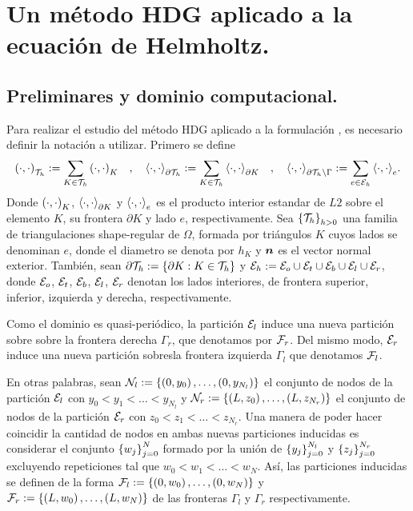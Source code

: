 \chapter{Un método HDG aplicado a la ecuación de Helmholtz.}
\section{Preliminares y dominio computacional.}
Para realizar el estudio del método HDG aplicado a la formulación , es necesario definir la notación a utilizar.
Primero se define
\[ \left( \cdot,\cdot \right)_{\mathcal{T}_h} := \sum_{K \in \mathcal{T}_h}{\left( \cdot,\cdot \right)_{K}} \quad,\quad \left\langle \cdot,\cdot \right\rangle_{\partial \mathcal{T}_h} := \sum_{K \in \mathcal{T}_h}{\left\langle \cdot,\cdot \right\rangle_{\partial K}} \quad,\quad  \left\langle \cdot,\cdot \right\rangle_{\partial \mathcal{T}_h \backslash \Gamma} := \sum_{e \in \mathcal{E}_h}{\left\langle \cdot,\cdot \right\rangle_{e}} .\]
Donde $\left( \cdot,\cdot \right)_K$, $\left\langle \cdot,\cdot \right\rangle_{\partial K}$ y $\left\langle \cdot,\cdot \right\rangle_{e}$ es el producto interior estandar de $L2$ sobre el elemento $K$, su frontera $\partial K$ y lado $e$, respectivamente. Sea $\left\{ \mathcal{T}_h \right\}_{h>0}$ una familia de triangulaciones {\sc shape-regular} de $\Omega$, formada por triángulos $K$ cuyos lados se denominan $e$, donde el diametro se denota por $h_K$ y $\boldsymbol n$ es el vector normal exterior. También, sean $\partial \mathcal{T}_h := \left\{ \partial K : K \in \mathcal{T}_h \right\}$ y $\mathcal{E}_h := \mathcal{E}_o \cup \mathcal{E}_t \cup \mathcal{E}_b \cup \mathcal{E}_l \cup \mathcal{E}_r$, donde $\mathcal{E}_o$, $\mathcal{E}_t$, $\mathcal{E}_b$, $\mathcal{E}_l$, $\mathcal{E}_r$ denotan los lados interiores, de frontera superior, inferior, izquierda y derecha, respectivamente.

Como el dominio es quasi-periódico, la partición $\mathcal{E}_l$ induce una nueva partición sobre sobre la frontera derecha $\Gamma_r$, que denotamos por $\mathcal{F}_r$. Del mismo modo, $\mathcal{E}_r$ induce una nueva partición sobresla frontera izquierda $\Gamma_l$ que denotamos $\mathcal{F}_l$. 

En otras palabras, sean $\mathcal{N}_l := \left\{ \left( 0,y_0 \right), \ldots , \left( 0,y_{N_l} \right) \right\}$ el conjunto de nodos de la partición $\mathcal{E}_l$ con $y_0 < y_1 < \ldots < y_{N_l}$ y $\mathcal{N}_r := \left\{ \left( L,z_0 \right), \ldots , \left( L,z_{N_r} \right) \right\}$ el conjunto de nodos de la partición $\mathcal{E}_r$ con $z_0 < z_1 < \ldots < z_{N_r}$. Una manera de poder hacer coincidir la cantidad de nodos en ambas nuevas particiones inducidas es considerar el conjunto $\left\{ w_j \right\}_{j=0}^N$ formado por la unión de $\left\{ y_j \right\}_{j=0}^{N_l}$ y $\left\{ z_j \right\}_{j=0}^{N_r}$ excluyendo repeticiones tal que $w_0 < w_1 < \ldots < w_{N}$. Así, las particiones inducidas se definen de la forma $\mathcal{F}_l := \left\{ \left( 0,w_0 \right), \ldots , \left( 0,w_{N} \right) \right\}$ y $\mathcal{F}_r := \left\{ \left( L,w_0 \right), \ldots , \left( L,w_{N} \right) \right\}$ de las fronteras $\Gamma_l$ y $\Gamma_r$ respectivamente.

